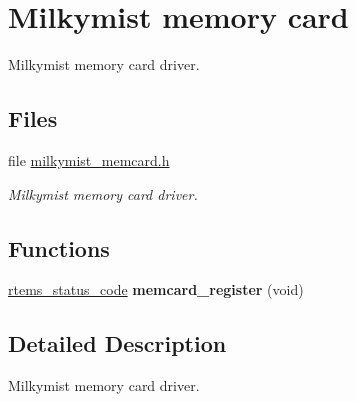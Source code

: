 \hypertarget{group__lm32__milkymist__memcard}{}\section{Milkymist memory card}
\label{group__lm32__milkymist__memcard}


Milkymist memory card driver.  


\subsection*{Files}
\begin{DoxyCompactItemize}
\item 
file \mbox{\hyperlink{milkymist__memcard_8h}{milkymist\+\_\+memcard.\+h}}
\begin{DoxyCompactList}\small\item\em Milkymist memory card driver. \end{DoxyCompactList}\end{DoxyCompactItemize}
\subsection*{Functions}
\begin{DoxyCompactItemize}
\item 
\mbox{\label{group__lm32__milkymist__memcard_ga619ab5abf1d1b287a8b02453dce02cf9}} 
\mbox{\hyperlink{group__ClassicStatus_ga545d41846817eaba6143d52ee4d9e9fe}{rtems\+\_\+status\+\_\+code}} {\bfseries memcard\+\_\+register} (void)
\end{DoxyCompactItemize}


\subsection{Detailed Description}
Milkymist memory card driver. 


